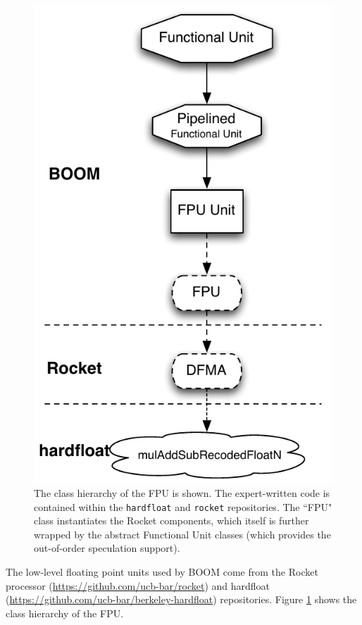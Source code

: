 \begin{figure}[htbp]
	\centering
	\centerline{\includegraphics[scale =0.9] {figures/functional-unit-fpu}}
	\caption{ \small The class hierarchy of the FPU is shown. The expert-written code is contained within the {\tt hardfloat} and {\tt rocket} repositories. The ``FPU" class instantiates the Rocket components, which itself is further wrapped by the abstract Functional Unit classes (which provides the out-of-order speculation support).}
	\label{fig:functional-unit-fpu}
\end{figure}

The low-level floating point units used by BOOM come from the Rocket processor (\url{https://github.com/ucb-bar/rocket}) and hardfloat (\url{https://github.com/ucb-bar/berkeley-hardfloat}) repositories.  Figure \ref{fig:functional-unit-fpu} shows the class hierarchy of the FPU. 

